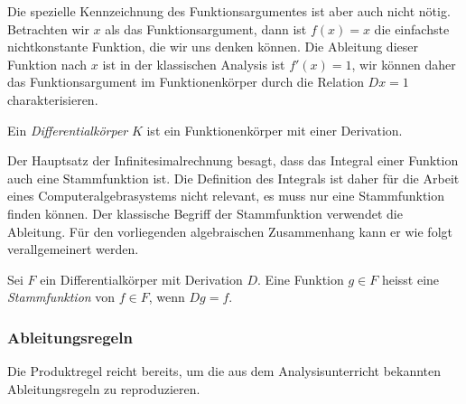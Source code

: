 Die spezielle Kennzeichnung des Funktionsargumentes ist aber auch
nicht nötig.
Betrachten wir $x$ als das Funktionsargument, dann ist $f(x)=x$ die
einfachste nichtkonstante Funktion, die wir uns denken können.
Die Ableitung dieser Funktion nach $x$ ist in der klassischen Analysis
ist $f'(x)=1$, wir können daher das Funktionsargument im Funktionenkörper
durch die Relation $Dx=1$ charakterisieren.

\begin{definition}[Differentialkörper]
%
Ein \emph{Differentialkörper} $K$ ist ein Funktionenkörper mit einer
Derivation.
\end{definition}

Der Hauptsatz der Infinitesimalrechnung besagt, dass das Integral
einer Funktion auch eine Stammfunktion ist.
Die Definition des Integrals ist daher für die Arbeit eines
Computeralgebrasystems nicht relevant, es muss nur eine Stammfunktion
finden können.
Der klassische Begriff der Stammfunktion verwendet die Ableitung.
Für den vorliegenden algebraischen Zusammenhang kann er wie folgt
verallgemeinert werden.

\begin{definition}[Stammfunktion]
Sei $F$ ein Differentialkörper mit Derivation $D$.
Eine Funktion $g\in F$ heisst eine \emph{Stammfunktion} von 
$f\in F$, wenn $Dg=f$.
%
\end{definition}

%
%
\subsubsection{Ableitungsregeln}
Die Produktregel reicht bereits, um die aus dem Analysisunterricht
bekannten Ableitungsregeln zu reproduzieren.

